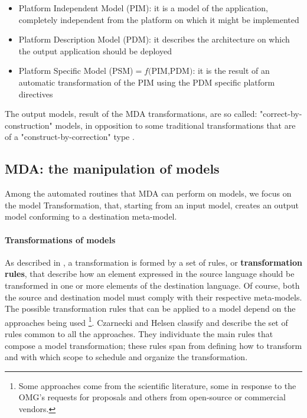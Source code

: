 \begin{itemize}
 \item Platform Independent Model (PIM): it is a model of the application, completely independent from the platform on which it might be implemented
 \item Platform Description Model (PDM): it describes the architecture on which the output application should be deployed
 \item Platform Specific Model (PSM)$=f($PIM,PDM$)$: it is the result of an automatic transformation of the PIM using the PDM specific platform directives  
\end{itemize}

The output models, result of the MDA transformations, are so called: "correct-by-construction" models, in opposition to some traditional transformations that are of a "construct-by-correction" type \cite{Marrone}.   


\subsection{MDA: the manipulation of models}
\label{MDAModelManipulation}
Among the automated routines that MDA can perform on models, we focus on the model Transformation, that, starting from an input model, creates an output model conforming to a destination meta-model. 

\paragraph{Transformations of models}
As described in \cite{Papa11}, a transformation is formed by a set of rules, or \textbf{transformation rules}, that describe how an element expressed in the source language should be transformed in one or more elements of the destination language.
Of course, both the source and destination model must comply with their respective meta-models.
The possible transformation rules that can be applied to a model depend on the approaches being used \footnote{Some approaches come from the scientific literature, some in response to the OMG's requests for proposals and others from open-source or commercial vendors.}. Czarnecki and Helsen \cite{Czarnecki03classificationof} classify and describe the set of rules common to all the approaches.
They individuate the main rules that compose a model transformation; these rules span from defining how to transform and with which scope to schedule and organize the transformation.

